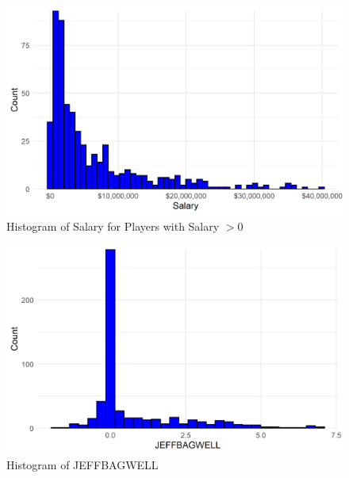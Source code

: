 \documentclass{article}
\begin{document}
\begin{figure}[h]
\caption{Histogram of Salary for Players with Salary $> 0$}
\label{fig:salary_hist}
\centering
\includegraphics[width=0.7\paperwidth, scale=1.25]{salary_hist.png}
\end{figure}

\begin{figure}[h]
\caption{Histogram of JEFFBAGWELL}
\label{fig:bwar_hist}
\centering
\includegraphics[width=0.7\paperwidth, scale=1.25]{war_hist.png}
\end{figure}
\end{document}
